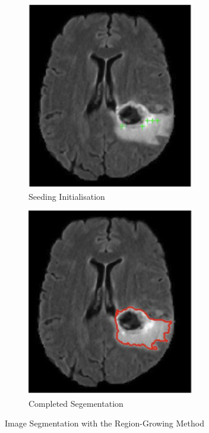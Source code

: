 \begin{figure}[htp]
    \centering
    \begin{subfigure}[b]{0.45\textwidth}
        \centering
        \includegraphics[width=0.8\textwidth]{./figures/rg-img.png}
        \caption{Seeding Initialisation}
        \label{fig:rg-seeding}
    \end{subfigure}
    \hfill
    \begin{subfigure}[b]{0.45\textwidth}
        \centering
        \includegraphics[width=0.8\textwidth]{./figures/rg-seg.png}
        \caption{Completed Segementation}
        \label{fig:rg-segmentation}
    \end{subfigure}
    \caption{Image Segmentation with the Region-Growing Method}
    \label{fig:}
\end{figure}

